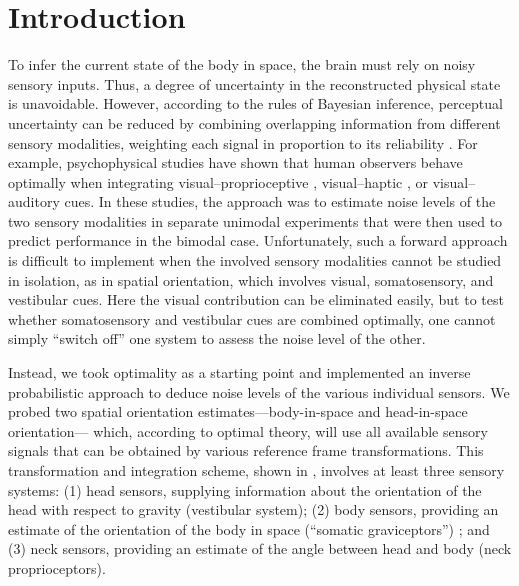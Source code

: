 \newpage


\section{Introduction}

To infer the current state of the body in space, the brain must rely on noisy sensory inputs. Thus, a degree of uncertainty in the reconstructed physical state is unavoidable. However, according to the rules of Bayesian inference, perceptual uncertainty can be reduced by combining overlapping information from different sensory modalities, weighting each signal in proportion to its reliability \cite{knill2004,kording2004,angelaki2008}. For example, psychophysical studies have shown that human observers behave optimally when integrating visual--proprioceptive \cite{vanbeers1999}, visual--haptic \cite{ernst2002}, or visual--auditory \cite{alais2004} cues. In these studies, the approach was to estimate noise levels of the two sensory modalities in separate unimodal experiments that were then used to predict performance in the bimodal case. Unfortunately, such a forward approach is difficult to implement when the involved sensory modalities cannot be studied in isolation, as in spatial orientation, which involves visual, somatosensory, and vestibular cues. Here the visual contribution can be eliminated easily, but to test whether somatosensory and vestibular cues are combined optimally, one cannot simply ``switch off'' one system to assess the noise level of the other.

Instead, we took optimality as a starting point and implemented an inverse probabilistic approach to deduce noise levels of the various individual sensors. We probed two spatial orientation estimates---body-in-space and head-in-space orientation--- which, according to optimal theory, will use all available sensory signals that can be obtained by various reference frame transformations. This transformation and integration scheme, shown in , involves at least three sensory systems: (1) head sensors, supplying information about the orientation of the head with respect to gravity (vestibular system); (2) body sensors, providing an estimate of the orientation of the body in space (``somatic graviceptors'') \cite{mittelstaedt1997}; and (3) neck sensors, providing an estimate of the angle between head and body (neck proprioceptors).

